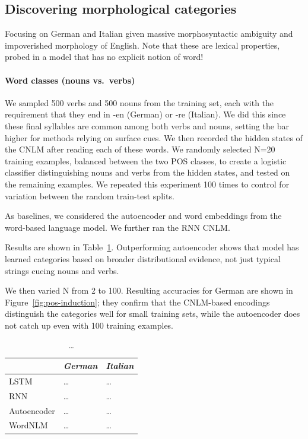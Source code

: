 

\subsection{Discovering morphological categories}
\label{sec:categories}

Focusing on German and Italian given massive morphosyntactic ambiguity
and impoverished morphology of English. Note that these are lexical
properties, probed in a model that has no explicit notion of word!

\paragraph{Word classes (nouns vs.~verbs)}


We sampled 500 verbs and 500 nouns from the training set, each with the requirement that they end in -en (German) or -re (Italian).
We did this since these final syllables are common among both verbs and nouns, setting the bar higher for methods relying on surface cues.
We then recorded the hidden states of the CNLM after reading each of these words.
We randomly selected N=20 training examples, balanced between the two POS classes, to create a logistic classifier distinguishing nouns and verbs from the hidden states, and tested on the remaining examples.
We repeated this experiment 100 times to control for variation between the random train-test splits.

As baselines, we considered the autoencoder and word embeddings from the word-based language model.
We further ran the RNN CNLM.

Results are shown in Table~\ref{tab:pos-results}.
Outperforming autoencoder shows that model has learned categories based on broader distributional evidence, not just typical strings cueing nouns and verbs.


We then varied N from 2 to 100.
Resulting accuracies for German are shown in Figure~\ref{fig:pos-induction}; they confirm that the CNLM-based encodings distinguish the categories well for small training sets, while the autoencoder does not catch up even with 100 training examples.




\begin{table}[t]
  \begin{center}
    \begin{tabular}{l|l|l}
      \multicolumn{1}{c}{}&\emph{German}&\emph{Italian}\\
      \hline
      LSTM&\ldots&\ldots\\
      RNN&\ldots&\ldots\\
      Autoencoder&\ldots&\ldots\\
      WordNLM&\ldots&\ldots\\
    \end{tabular}
  \end{center}
  \caption{\label{tab:pos-results} \ldots}
\end{table}


